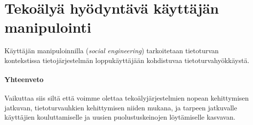 


\chapter*{Tekoälyä hyödyntävä käyttäjän\\manipulointi\label{chapter:finnish}}
\begin{comment}

Guides:
    - 4 or 5 pages

\end{comment}

Käyttäjän manipuloinnilla (\textit{social engineering}) tarkoitetaan tietoturvan kontekstissa tietojärjestelmän loppukäyttäjään kohdistuvaa tietoturvahyökkäystä.

\subsubsection{Yhteenveto}

Vaikuttaa siis siltä että voimme olettaa tekoälyjärjestelmien nopean kehittymisen jatkuvan, tietoturvauhkien kehittymisen niiden mukana, ja tarpeen jatkuvalle käyttäjien kouluttamiselle ja uusien puolustuskeinojen löytämiselle kasvavan.